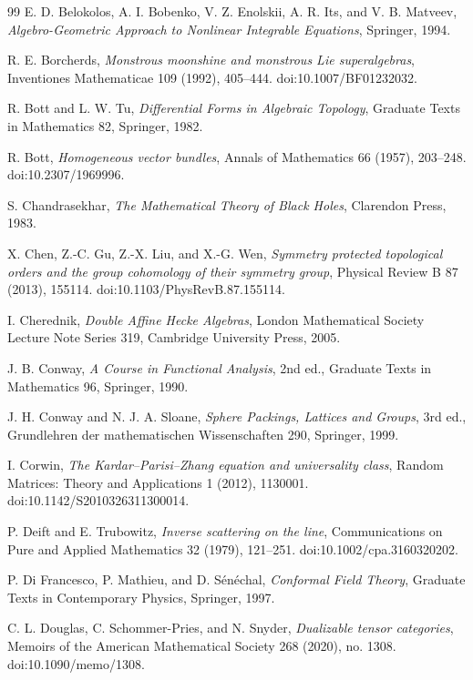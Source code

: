 \documentclass[11pt]{article}
\theoremstyle{definition}
\begin{document}
\begin{thebibliography}{99}
E. D. Belokolos, A. I. Bobenko, V. Z. Enolskii, A. R. Its, and
V. B. Matveev,
\emph{Algebro-Geometric Approach to Nonlinear Integrable Equations},
Springer, 1994.

R. E. Borcherds,
\emph{Monstrous moonshine and monstrous Lie superalgebras},
Inventiones Mathematicae 109 (1992), 405--444.
doi:10.1007/BF01232032.

R. Bott and L. W. Tu,
\emph{Differential Forms in Algebraic Topology},
Graduate Texts in Mathematics 82, Springer, 1982.

R. Bott,
\emph{Homogeneous vector bundles},
Annals of Mathematics 66 (1957), 203--248.
doi:10.2307/1969996.

S. Chandrasekhar,
\emph{The Mathematical Theory of Black Holes},
Clarendon Press, 1983.

X. Chen, Z.-C. Gu, Z.-X. Liu, and X.-G. Wen,
\emph{Symmetry protected topological orders and the group cohomology of
their symmetry group},
Physical Review B 87 (2013), 155114.
doi:10.1103/PhysRevB.87.155114.

I. Cherednik,
\emph{Double Affine Hecke Algebras},
London Mathematical Society Lecture Note Series 319,
Cambridge University Press, 2005.

J. B. Conway,
\emph{A Course in Functional Analysis}, 2nd ed.,
Graduate Texts in Mathematics 96, Springer, 1990.

J. H. Conway and N. J. A. Sloane,
\emph{Sphere Packings, Lattices and Groups}, 3rd ed.,
Grundlehren der mathematischen Wissenschaften 290, Springer, 1999.

I. Corwin,
\emph{The Kardar--Parisi--Zhang equation and universality class},
Random Matrices: Theory and Applications 1 (2012), 1130001.
doi:10.1142/S2010326311300014.

P. Deift and E. Trubowitz,
\emph{Inverse scattering on the line},
Communications on Pure and Applied Mathematics 32 (1979), 121--251.
doi:10.1002/cpa.3160320202.

P. Di Francesco, P. Mathieu, and D. S\'en\'echal,
\emph{Conformal Field Theory},
Graduate Texts in Contemporary Physics, Springer, 1997.

C. L. Douglas, C. Schommer-Pries, and N. Snyder,
\emph{Dualizable tensor categories},
Memoirs of the American Mathematical Society 268 (2020), no. 1308.
doi:10.1090/memo/1308.


\end{thebibliography}
\end{document}
